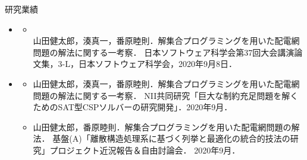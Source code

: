 \documentclass[dvipdfmx,11pt]{beamer}
\begin{document}
\begin{frame}{研究業績}
 \begin{itemize}
  \item {}
  \begin{itemize}
   \item {}\\
         山田健太郎，湊真一，番原睦則．解集合プログラミングを用いた配電網問題の解法に関する一考察．
         日本ソフトウェア科学会第37回大会講演論文集，3-L，日本ソフトウェア科学会，2020年9月8日．
  \end{itemize}
  \item {}
  \begin{itemize}
   \setlength{\itemsep}{3pt} %
   \item 山田健太郎，湊真一，番原睦則．解集合プログラミングを用いた配電網問題の解法に関する一考察．
         NII共同研究「巨大な制約充足問題を解くためのSAT型CSPソルバーの研究開発」．2020年9月．
   \item 山田健太郎，番原睦則．解集合プログラミングを用いた配電網問題の解法．
         基盤(A)「離散構造処理系に基づく列挙と最適化の統合的技法の研究」プロジェクト近況報告＆自由討論会．
         2020年9月．
  \end{itemize}
 \end{itemize}
\end{frame}


\end{document}
